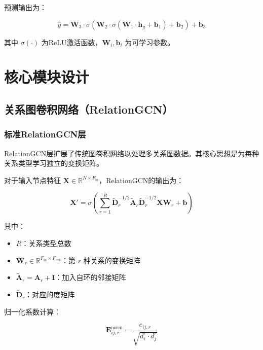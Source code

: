 预测输出为：

\begin{equation}
\hat{y} = \mathbf{W}_3 \cdot \sigma\left(\mathbf{W}_2 \cdot \sigma\left(\mathbf{W}_1 \cdot \mathbf{h}_g + \mathbf{b}_1\right) + \mathbf{b}_2\right) + \mathbf{b}_3
\end{equation}

其中 $\sigma(\cdot)$ 为ReLU激活函数，$\mathbf{W}_i, \mathbf{b}_i$ 为可学习参数。

\newpage

\section{核心模块设计}

\subsection{关系图卷积网络（RelationGCN）}

\subsubsection{标准RelationGCN层}

RelationGCN层扩展了传统图卷积网络以处理多关系图数据。其核心思想是为每种关系类型学习独立的变换矩阵。

对于输入节点特征 $\mathbf{X} \in \mathbb{R}^{N \times F_{\text{in}}}$，RelationGCN的输出为：

\begin{equation}
\mathbf{X}' = \sigma\left( \sum_{r=1}^{R} \tilde{\mathbf{D}}_r^{-1/2} \tilde{\mathbf{A}}_r \tilde{\mathbf{D}}_r^{-1/2} \mathbf{X} \mathbf{W}_r + \mathbf{b} \right)
\end{equation}

其中：
\begin{itemize}
    \item $R$：关系类型总数
    \item $\mathbf{W}_r \in \mathbb{R}^{F_{\text{in}} \times F_{\text{out}}}$：第 $r$ 种关系的变换矩阵
    \item $\tilde{\mathbf{A}}_r = \mathbf{A}_r + \mathbf{I}$：加入自环的邻接矩阵
    \item $\tilde{\mathbf{D}}_r$：对应的度矩阵
\end{itemize}

归一化系数计算：

\begin{equation}
\mathbf{E}^{\text{norm}}_{ij,r} = \frac{e_{ij,r}}{\sqrt{d_i^r \cdot d_j^r}}
\end{equation}

